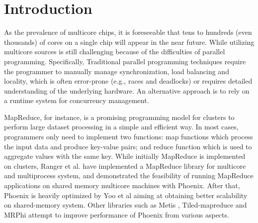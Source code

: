 \section{Introduction}
\label{sec:intro}



As the prevalence of multicore chips, it is foreseeable that tens to hundreds (even thousands) of cores on a single chip will appear in the near future\cite{Borkar2007core}.
While utilizing multicore sources is still challenging because of the difficulties of parallel programming.
Specifically, Traditional parallel programming techniques require the programmer to manually manage synchronization, load balancing and locality, which is often error-prone (e.g., races and deadlocks) or requires detailed understanding of the underlying hardware.
An alternative approach is to rely on a runtime system for concurrency management. 

MapReduce\cite{dean2004mapreduce}, for instance, is a promising programming model for clusters to perform large dataset processing in a simple and efficient way.
In most cases, programmers only need to implement two functions: 
map functions which process the input data and produce key-value pairs; and reduce function which is used to aggregate values with the same key.
While initially MapReduce is implemented on clusters, Ranger et al. have implemented a MapReduce library for multicore and multiprocess system, and demonstrated the feasibility of running MapReduce applications on shared memory multicore machines with Phoenix\cite{ranger2007phoenix}.
After that, Phoenix is heavily optimized by Yoo et al\cite{yoo2009phoenix2} aiming at obtaining better scalability on shared-memory system.
Other libraries such as Metis\cite{mao2010metis} , Tiled-mapreduce\cite{chen2010tiled} and MRPhi\cite{lu2013mrphi} attempt to improve performance of Phoenix from various aspects.



